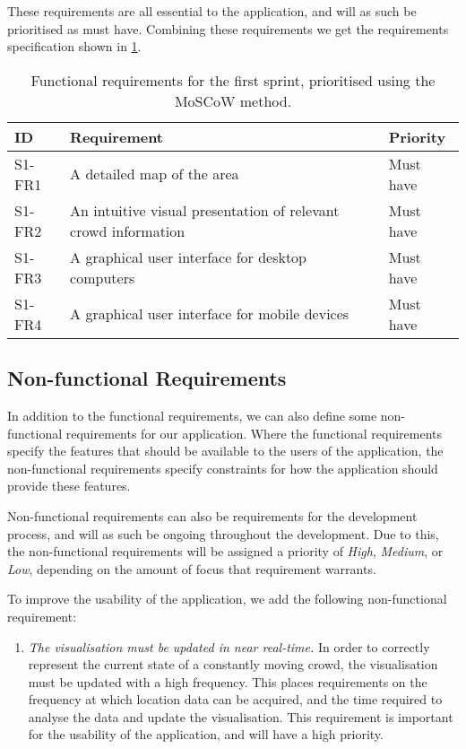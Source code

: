 These requirements are all essential to the application, and will as such be prioritised as must have. Combining these requirements we get the requirements specification shown in \cref{tab:s1_req}.

\begin{table}[htbp]
	\centering
	\begin{tabularx}{\textwidth}{lXl}
		\toprule
		\textbf{ID} & \textbf{Requirement} & \textbf{Priority} \\
		\midrule 
		\rowcolor[HTML]{EFEFEF} 
		S1-FR1 & A detailed map of the area & Must have \\
		S1-FR2 & An intuitive visual presentation of relevant crowd information & Must have \\
		\rowcolor[HTML]{EFEFEF} 
		S1-FR3 & A graphical user interface for desktop computers & Must have \\
		S1-FR4 & A graphical user interface for mobile devices & Must have \\
		\bottomrule
	\end{tabularx}
	\caption{Functional requirements for the first sprint, prioritised using the MoSCoW method.}
	\label{tab:s1_req}
\end{table}

\subsection{Non-functional Requirements} \label{ss:s1_nfreqs}
In addition to the functional requirements, we can also define some non-functional requirements for our application. Where the functional requirements specify the features that should be available to the users of the application, the non-functional requirements specify constraints for how the application should provide these features. 

Non-functional requirements can also be requirements for the development process, and will as such be ongoing throughout the development. Due to this, the non-functional requirements will be assigned a priority of \emph{High}, \emph{Medium}, or \emph{Low}, depending on the amount of focus that requirement warrants. 

To improve the usability of the application, we add the following non-functional requirement:

\begin{enumerate}
    \item \emph{The visualisation must be updated in near real-time.} In order to correctly represent the current state of a constantly moving crowd, the visualisation must be updated with a high frequency. This places requirements on the frequency at which location data can be acquired, and the time required to analyse the data and update the visualisation. This requirement is important for the usability of the application, and will have a high priority.
\end{enumerate}

